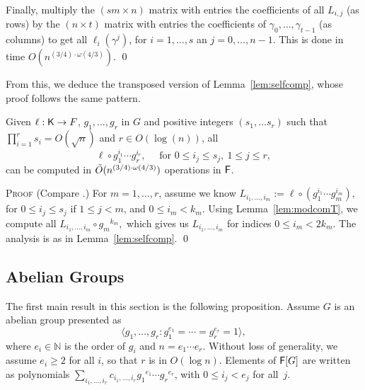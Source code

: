   Finally, multiply the $(sm \times n)$ matrix with entries the
  coefficients of all $L_{i,j}$ (as rows) by the $(n \times t)$ matrix with
  entries the coefficients of $\gamma_0,\dots,\gamma_{t-1}$ (as columns) to
get all $\ell_i(\gamma^j)$, for $i=1,\dots,s$ an
  $j=0,\dots,n-1$.  This is done in time
  $O(n^{(3/4)\cdot\omega(4/3)})$.
\qed

From this, we deduce the transposed version of Lemma~\ref{lem:selfcomp},
whose proof follows the same pattern.

\begin{lemma}
  \label{lem:transmodcomp}
  Given $\ell:{\mathsf{K}}\to F$, $g_1, \ldots , g_{r}$ in $G$
  and positive integers $(s_1, \ldots s_r)$ such that
  $\prod_{i = 1}^r s_i = O(\sqrt{n})$ and $r \in O(\log(n))$, all 
  \[
    \ell \circ g_1^{i_1}\cdots g_r^{i_r} ,\quad \text{~for~} 0 \leq i_j
    \leq s_j,\ 1 \leq j \leq r,
  \]
  can be computed in $\tilde{O}(n^{(3/4)\cdot \omega(4/3)})$ operations in ${\mathsf{F}}$.
\end{lemma} 
\noindent\textsc{Proof}
(Compare \cite[Lemma~8]{KalSho98}.)
For $m=1,\dots,r$, assume
  we know $L_{i_1,\dots,i_m}:=\ell \circ (g_1^{i_1}\cdots g_m^{i_m}),$
  for $0 \leq i_j \leq s_j$ if $1 \leq j < m$, and $0 \leq i_m < k_m.$
  Using Lemma~\ref{lem:modcomT}, we compute all $L_{i_1,\dots,i_m} \circ
  {g_m}^{k_m},$ which gives us $L_{i_1,\dots,i_m}$ for indices $0 \le
  i_m < 2k_m$. The analysis is as in Lemma~\ref{lem:selfcomp}.
\qed



\subsection{Abelian Groups}
\label{ssec:proj_abelian}

The first main result in this section is the following proposition.
Assume $G$ is an abelian group presented as 
\[
  \langle g_1, \ldots , g_r: g_{1}^{e_1} = \cdots = g_{r}^{e_r} = 1
  \rangle,
\]
where $ e_i \in \mathbb{N}$ is the order of $g_i$ and $n = e_1 \cdots
e_r$.  Without loss of generality, we assume $e_i \ge 2$ for all $i$,
so that $r$ is in $O(\log n)$. Elements of ${\mathsf{F}}[G]$ are written as
polynomials $\sum_{i_1,\dots,i_r} c_{i_1,\dots,i_r}
{g_1}^{e_1} \cdots {g_r}^{e_r}$, with $0\le i_j < e_j$ for all~$j$.


